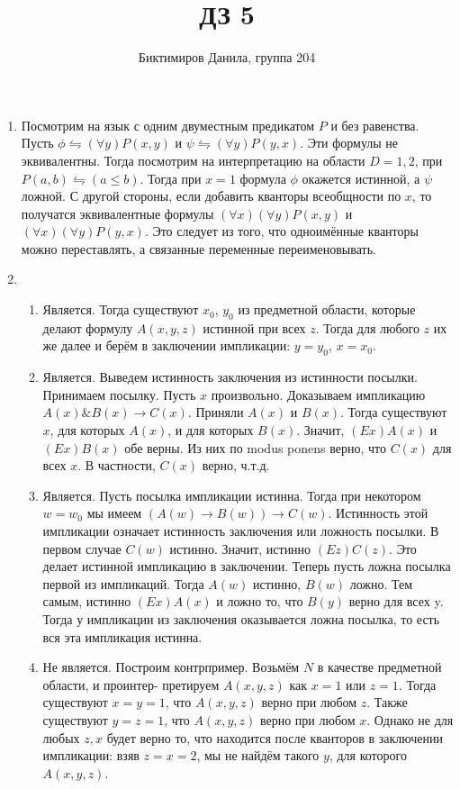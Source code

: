 \documentclass[11pt]{article}
\begin{document}
	
	\author{Биктимиров Данила, группа 204}
	\title{ДЗ 5}
	\date{}
	\maketitle
	
	\medskip
	
	\begin{enumerate}
		\item Посмотрим на язык с одним двуместным предикатом $P$ и без равенства. Пусть $\phi \leftrightharpoons (\forall y)P(x,y)$ и $\psi \leftrightharpoons (\forall y)P(y,x)$. Эти формулы не эквивалентны. Тогда посмотрим на интерпретацию на области $D={1,2}$, при $P(a,b)\leftrightharpoons(a\le b)$. Тогда при $x=1$ формула $\phi$ окажется истинной, а $\psi$ ложной. С другой стороны, если добавить кванторы всеобщности по $x$, то получатся эквивалентные формулы $(\forall x)(\forall y)P(x,y)$ и $(\forall x)(\forall y)P(y,x)$. Это следует из того, что одноимённые кванторы можно переставлять, а связанные переменные переименовывать.
		\item \begin{enumerate}
			\item Является. Тогда существуют $x_0$, $y_0$ из предметной области, которые делают формулу $A(x,y,z)$ истинной при всех $z$. Тогда для любого $z$ их же далее и берём в заключении импликации: $y=y_0$, $x=x_0$.
			
			\item Является. Выведем истинность заключения из истинности посылки. Принимаем посылку. Пусть $x$ произвольно. Доказываем импликацию $A(x)\& B(x)\to C(x)$. Приняли $A(x)$ и $B(x)$. Тогда существуют $x$, для которых $A(x)$, и для которых $B(x)$. Значит, $(Ex)A(x)$ и $(Ex)B(x)$ обе верны. Из них по modus ponens верно, что $C(x)$ для всех $x$. В частности, $C(x)$ верно, ч.т.д.
			
			\item Является. Пусть посылка импликации истинна. Тогда при некотором $w=w_0$ мы имеем $(A(w)\to B(w))\to C(w)$. Истинность этой импликации означает истинность заключения или ложность посылки. В первом случае $C(w)$ истинно. Значит, истинно $(Ez)C(z)$. Это делает истинной импликацию в заключении. Теперь пусть ложна посылка первой из импликаций. Тогда $A(w)$ истинно, $B(w)$ ложно. Тем самым, истинно $(Ex)A(x)$ и ложно то, что $B(y)$ верно для всех y. Тогда у импликации из заключения оказывается ложна посылка, то есть вся эта импликация истинна.
			
			\item Не является. Построим контрпример. Возьмём $N$ в качестве предметной области, и проинтер- претируем $A(x,y,z)$ как $x=1$ или $z=1$. Тогда существуют $x=y=1$, что $A(x,y,z)$ верно при любом $z$. Также существуют $y=z=1$, что $A(x,y,z)$ верно при любом $x$. Однако не для любых $z,x$ будет верно то, что находится после кванторов в заключении импликации: взяв $z=x=2$, мы не найдём такого $y$, для которого $A(x,y,z)$.
			

\end{enumerate}
\end{enumerate}
\end{document}
